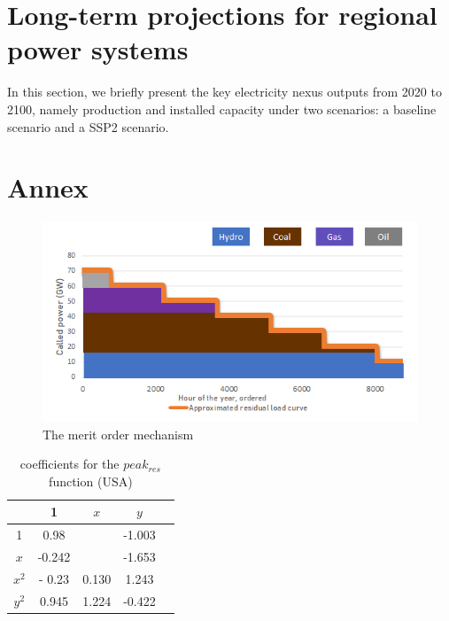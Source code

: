 \section{Long-term projections for regional power systems}
In this section, we briefly present the key electricity nexus outputs from 2020 to 2100, namely production and installed capacity under two scenarios: a baseline scenario and a SSP2 scenario.

\newpage
\section{Annex}

\begin{figure}[H]
    \centering
    \includegraphics{figures&tables/dispatch.png}
    \caption{The merit order mechanism}
    \label{fig:dispatch}
\end{figure}

    \begin{table}[H]
        \centering
        \begin{tabular}{|c||c|c|c|c|}
            \hline
                  & 1   & $x$ & $y$ \\
                  \hline
                  \hline
            1     &0.98&      & -1.003\\
            \hline
            $x$   & -0.242  &       & -1.653 \\
                  \hline
            $x^2$ & - 0.23    &  0.130     & 1.243 \\
            \hline
            $y^2$ &  0.945   &   1.224    &-0.422 \\
                  \hline
                  \hline
        \end{tabular}
        \caption{ coefficients for the $peak_{res}$ function (USA)}
    \end{table}
